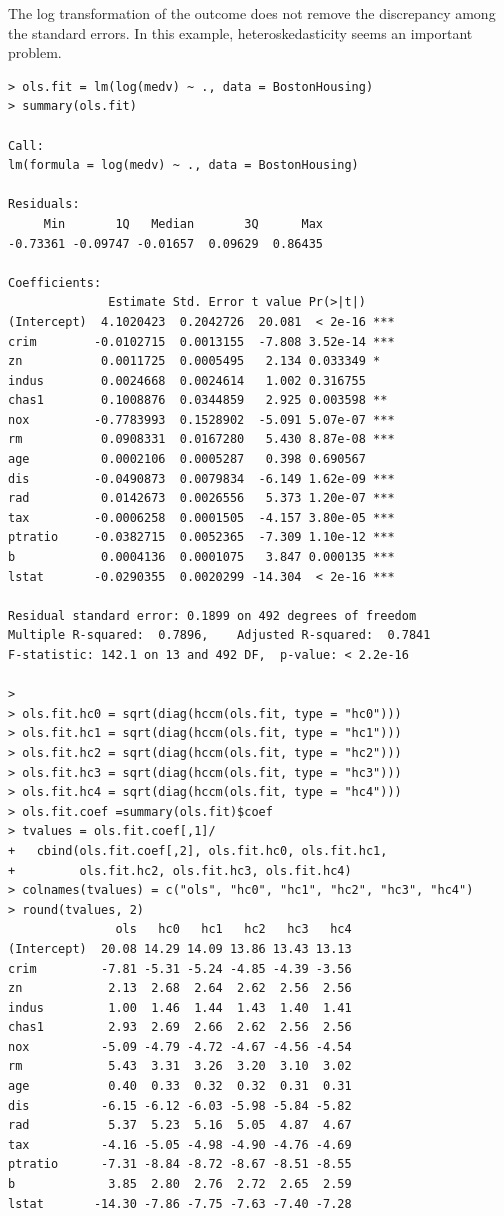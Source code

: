 The log transformation of the outcome does not remove the discrepancy among the standard errors. In this example, heteroskedasticity seems an important problem. 


\begin{lstlisting}
> ols.fit = lm(log(medv) ~ ., data = BostonHousing)
> summary(ols.fit)

Call:
lm(formula = log(medv) ~ ., data = BostonHousing)

Residuals:
     Min       1Q   Median       3Q      Max 
-0.73361 -0.09747 -0.01657  0.09629  0.86435 

Coefficients:
              Estimate Std. Error t value Pr(>|t|)    
(Intercept)  4.1020423  0.2042726  20.081  < 2e-16 ***
crim        -0.0102715  0.0013155  -7.808 3.52e-14 ***
zn           0.0011725  0.0005495   2.134 0.033349 *  
indus        0.0024668  0.0024614   1.002 0.316755    
chas1        0.1008876  0.0344859   2.925 0.003598 ** 
nox         -0.7783993  0.1528902  -5.091 5.07e-07 ***
rm           0.0908331  0.0167280   5.430 8.87e-08 ***
age          0.0002106  0.0005287   0.398 0.690567    
dis         -0.0490873  0.0079834  -6.149 1.62e-09 ***
rad          0.0142673  0.0026556   5.373 1.20e-07 ***
tax         -0.0006258  0.0001505  -4.157 3.80e-05 ***
ptratio     -0.0382715  0.0052365  -7.309 1.10e-12 ***
b            0.0004136  0.0001075   3.847 0.000135 ***
lstat       -0.0290355  0.0020299 -14.304  < 2e-16 ***

Residual standard error: 0.1899 on 492 degrees of freedom
Multiple R-squared:  0.7896,	Adjusted R-squared:  0.7841 
F-statistic: 142.1 on 13 and 492 DF,  p-value: < 2.2e-16

> 
> ols.fit.hc0 = sqrt(diag(hccm(ols.fit, type = "hc0")))
> ols.fit.hc1 = sqrt(diag(hccm(ols.fit, type = "hc1")))
> ols.fit.hc2 = sqrt(diag(hccm(ols.fit, type = "hc2")))
> ols.fit.hc3 = sqrt(diag(hccm(ols.fit, type = "hc3")))
> ols.fit.hc4 = sqrt(diag(hccm(ols.fit, type = "hc4")))
> ols.fit.coef =summary(ols.fit)$coef
> tvalues = ols.fit.coef[,1]/
+   cbind(ols.fit.coef[,2], ols.fit.hc0, ols.fit.hc1, 
+         ols.fit.hc2, ols.fit.hc3, ols.fit.hc4)
> colnames(tvalues) = c("ols", "hc0", "hc1", "hc2", "hc3", "hc4")
> round(tvalues, 2)
               ols   hc0   hc1   hc2   hc3   hc4
(Intercept)  20.08 14.29 14.09 13.86 13.43 13.13
crim         -7.81 -5.31 -5.24 -4.85 -4.39 -3.56
zn            2.13  2.68  2.64  2.62  2.56  2.56
indus         1.00  1.46  1.44  1.43  1.40  1.41
chas1         2.93  2.69  2.66  2.62  2.56  2.56
nox          -5.09 -4.79 -4.72 -4.67 -4.56 -4.54
rm            5.43  3.31  3.26  3.20  3.10  3.02
age           0.40  0.33  0.32  0.32  0.31  0.31
dis          -6.15 -6.12 -6.03 -5.98 -5.84 -5.82
rad           5.37  5.23  5.16  5.05  4.87  4.67
tax          -4.16 -5.05 -4.98 -4.90 -4.76 -4.69
ptratio      -7.31 -8.84 -8.72 -8.67 -8.51 -8.55
b             3.85  2.80  2.76  2.72  2.65  2.59
lstat       -14.30 -7.86 -7.75 -7.63 -7.40 -7.28
\end{lstlisting}



